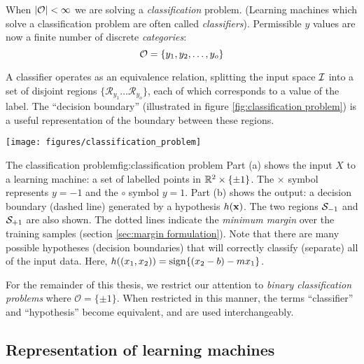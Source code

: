 When $|\mathcal{O}| < \infty$ we are solving a \emph{classification}
problem.  (Learning machines which solve a classification problem are
often called \emph{classifiers}).  Permissible $y$ values are now
a finite number of discrete \emph{categories}:
%
\begin{equation}
\mathcal{O} = \{y_1, y_2, \ldots, y_o\}
\end{equation}

A classifier operates as an equivalence relation, splitting the input
space $\mathcal{I}$ into a set of disjoint regions $\{ \mathcal{R}_{y_1}
\ldots \mathcal{R}_{y_o} \}$, each of which corresponds to a value of
the label.  The ``decision boundary'' (illustrated in figure
\ref{fig:classification problem}) is a useful representation of the
boundary between these regions.

\begin{linefigure}
\begin{center}
\texttt{[image: figures/classification\_problem]}
\end{center}
\begin{capt}{The classification problem}{fig:classification problem}
Part (a) shows the input $X$ to a learning machine: a set of
labelled points in $\mathbb{R}^2 \times \{ \pm 1 \}$.  The $\times$ symbol
represents $y=-1$ and the $\circ$ symbol $y=1$.  Part (b) shows the
output: a decision boundary (dashed line) generated by a hypothesis
$h(\mathbf{x})$.  The two regions $\mathcal{S}_{-1}$ and $\mathcal{S}_{+1}$ are also
shown.  The dotted lines indicate the \emph{minimum margin} over the
training samples (section \ref{sec:margin formulation}).  Note that
there are many possible hypotheses (decision boundaries) that will
correctly classify (separate) all of the input data.  Here, $h((x_1,
x_2)) = \mathrm{sign}\{ (x_2 - b) - m x_1 \}$.
\end{capt}
\end{linefigure}

For the remainder of this thesis, we restrict our attention to
\emph{binary classification problems} where $\mathcal{O} = \{\pm
1\}$.  When restricted in this manner, the terms ``classifier'' and
``hypothesis'' become equivalent, and are used interchangeably.


\subsection{Representation of learning machines}
\label{sec:representation of learning machines}

